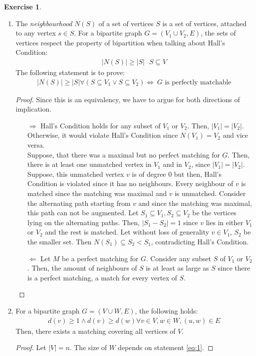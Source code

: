 \documentclass[a4paper,12pt,headsepline]{scrartcl}
\newtheorem{aufgabe}{Exercise}
\begin{document}
\begin{aufgabe}
\end{aufgabe}
\begin{enumerate}
	\item The \textit{neighbourhood} $N(S)$ of a set of vertices $S$ is a set of vertices, attached to any vertex $s\in S$. For a bipartite graph $G = (V_1 \cup V_2, E)$, the sets of vertices respect the property of bipartition when talking about Hall's Condition:
	\begin{align*}
	|N(S)| \geq |S| ~~~ S\subseteq V
	\end{align*}
	The following statement is to prove:
	\begin{align*}
	|N(S)| \geq |S| \forall (S\subseteq V_1 \vee S\subseteq V_2) \Leftrightarrow~G \text{ is perfectly matchable}
	\end{align*}
	\begin{proof}Since this is an equivalency, we have to argue for both directions of implication.
		\begin{itemize}
			\item[$\Rightarrow$] Hall's Condition holds for any subset of $V_1$ or $V_2$. Then, $|V_1| = |V_2|$. Otherwise, it would violate Hall's Condition since $N(V_1) = V_2$ and vice versa.\\
			Suppose, that there was a maximal but no perfect matching for $G$. Then, there is at least one unmatched vertex in $V_1$ and in $V_2$, since $|V_1| = |V_2|$. Suppose, this unmatched vertex $v$ is of degree 0 but then, Hall's Condition is violated since it has no neighbours. Every neighbour of $v$ is matched since the matching was maximal and $v$ is unmatched. Consider the alternating path starting from $v$ and since the matching was maximal, this path can not be augmented.  Let $S_1 \subseteq V_1, S_2\subseteq V_2$ be the vertices lying on the alternating paths. Then, $|S_1 - S_2| = 1$ since $v$ lies in either $V_1$ or $V_2$ and the rest is matched. Let without loss of generality $v\in V_1$, $S_2$ be the smaller set. Then $N(S_1) \subseteq S_2 < S_1$, contradicting Hall's Condition.
			\item[$\Leftarrow$] Let $M$ be a perfect matching for $G$. Consider any subset $S$ of $V_1$ or $V_2$. Then, the amount of neighbours of $S$ is at least as large as $S$ since there is a perfect matching, a match for every vertex of $S$.
		\end{itemize}
	\end{proof}
	\item For a bipartite graph $G = (V \cup W,E)$, the following holds:
	\begin{align}
		d(v) \geq 1 \wedge d(v) \geq d(w) \forall v\in V, w\in W, (u,w) \in E\label{eq:1}
	\end{align}
	Then, there exists a matching covering all vertices of $V$.
	\begin{proof}
		Let $|V| = n$. The size of $W$ depends on statement \ref{eq:1}. 
	
	\end{proof}
\end{enumerate}
\end{document}
